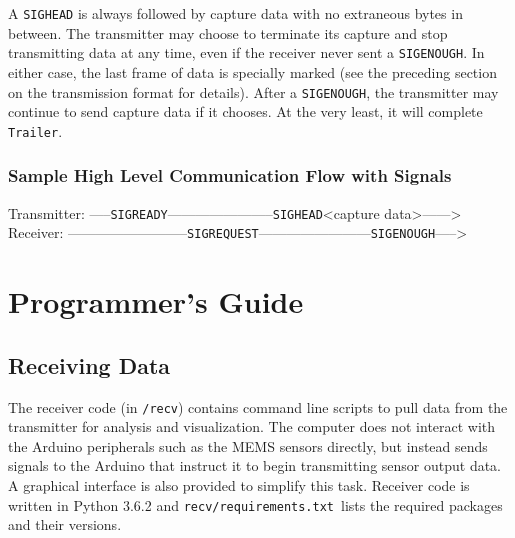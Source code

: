 \documentclass{article}
\begin{document}
        A \texttt{SIG\textunderscore HEAD} is always followed by capture data with no extraneous bytes in between. The transmitter may choose to terminate its capture and stop transmitting data at any time, even if the receiver never sent a \texttt{SIG\textunderscore ENOUGH}. In either case, the last frame of data is specially marked (see the preceding section on the transmission format for details). After a \texttt{SIG\textunderscore ENOUGH}, the transmitter may continue to send capture data if it chooses. At the very least, it will complete \texttt{Trailer}.
        
        \subsubsection{Sample High Level Communication Flow with Signals}
        Transmitter: -----\texttt{SIG\textunderscore READY}------------\textbar-----------\texttt{SIG\textunderscore HEAD}\textless capture da\textbar ta\textgreater\footnotemark------\textgreater\newline
        Receiver:    ---------------\textbar-----------\texttt{SIG\textunderscore REQUEST}---------\textbar---------------\texttt{SIG\textunderscore ENOUGH}-----\textgreater
        
        
    \section{Programmer's Guide}
    
    \subsection{Receiving Data}
    The receiver code (in \texttt{/recv}) contains command line scripts to pull data from the transmitter for analysis and visualization. The computer does not interact with the Arduino peripherals such as the MEMS sensors directly, but instead sends signals to the Arduino that instruct it to begin transmitting sensor output data. A graphical interface is also provided to simplify this task. Receiver code is written in Python 3.6.2 and \texttt{recv/requirements.txt}\footnotemark\ lists the required packages and their versions.
    
    
\end{document}
